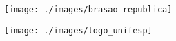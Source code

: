 \newpage
\thispagestyle{empty}
\begin{center}
\begin{minipage}{.15\textwidth}  
\texttt{[image: ./images/brasao\_republica]} %
\end{minipage}%
\begin{minipage}{.5\textwidth}
\centering
\textbf{\MakeUppercase{\imprimirinstituicao}} %
\end{minipage}%
\begin{minipage}{.2\textwidth}
\texttt{[image: ./images/logo\_unifesp]} %
\end{minipage}%
\end{center}
\vspace{3cm} %

\begin{center}

\large{\MakeUppercase{\imprimirautor}} %

\vspace{5cm} %

\textbf{\large{\MakeUppercase{\imprimirtitulo}}} %

\vspace{7.5cm} %

\large{\MakeUppercase{\imprimirlocal}}\break %
\imprimirdata %

\end{center}

\restoregeometry



